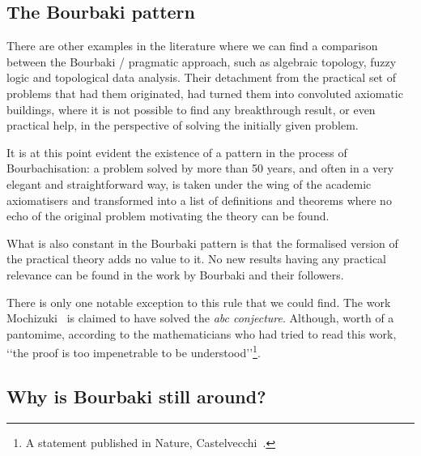 \documentclass[]{scrartcl}
\theoremstyle{definition}
\begin{document}
\subsection*{The Bourbaki pattern}

There are other examples in the literature where we can find a comparison between the Bourbaki / pragmatic approach, such as algebraic topology, fuzzy logic and topological data analysis. Their detachment from the practical set of problems that had them originated, had turned them into convoluted axiomatic buildings, where it is not possible to find any breakthrough result, or even practical help, in the perspective of solving the initially given problem.

It is at this point evident the existence of a pattern in the process of Bourbachisation: a problem solved by more than 50 years, and often in a very elegant and straightforward way, is taken under the wing of the academic axiomatisers and transformed into a list of definitions and theorems where no echo of the original problem motivating the theory can be found.


What is also constant in the Bourbaki pattern is that the formalised version of the practical theory adds no value to it. No new results having any practical relevance can be found in the work by Bourbaki and their followers.

There is only one notable exception to this rule that we could find. The work Mochizuki~\cite{mochizuki2012inter} is claimed to have solved the \emph{abc conjecture}. Although, worth of a pantomime, according to the mathematicians who had tried to read this work, \lq\lq the proof is too impenetrable to be understood\rq\rq\footnote{A statement published in Nature, Castelvecchi~\cite{castelvecchi2015biggest}.}.

\subsection*{Why is Bourbaki still around?}

\end{document}

